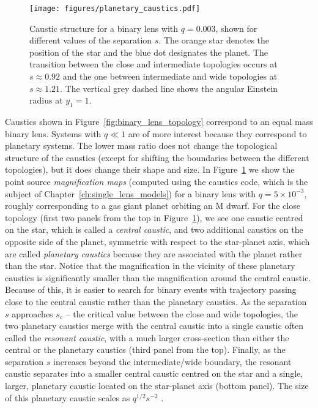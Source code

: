 \documentclass[12pt,dvipsnames]{report}
\newcommand{\ssf}[1]{\textsf{#1}}
\begin{document}
\begin{figure}[!t]
    \centering
    \texttt{[image: figures/planetary\_caustics.pdf]}
    \caption{Caustic structure for a binary lens with $q=0.003$, shown for different
        values of the separation $s$. The orange star denotes the position of the star and
        the blue dot designates the planet.
        The transition between the close and intermediate
        topologies occurs at $s\approx 0.92$ and the one between intermediate and wide
        topologies at $s\approx 1.21$. The vertical grey dashed line shows the angular
        Einstein radius at $y_1=1$. }
    \label{fig:planetary_caustics}
\end{figure}

Caustics shown in Figure~\ref{fig:binary_lens_topology} correspond to an equal
mass binary lens. Systems with $q\ll 1$ are of more interest because they correspond to
planetary systems. The lower mass ratio does not change the
topological structure of the caustics (except for shifting the boundaries
between the different topologies), but it does change their shape and size. In
Figure~\ref{fig:planetary_caustics} we show the point source \emph{magnification
    maps} (computed using the \ssf{caustics} code, which is the subject of
Chapter~\ref{ch:single_lens_models}) for a binary lens with $q=5\times
    10^{-3}$, roughly corresponding to a gas giant planet orbiting an M dwarf. For
the close topology (first two panels from the top in
Figure~\ref{fig:planetary_caustics}), we see one caustic centred on the star,
which is called a \emph{central caustic}, and two additional caustics on the
opposite side of the planet, symmetric with respect to the star-planet axis,
which are called \emph{planetary caustics} because they are associated with the
planet rather than the star. Notice that the magnification in the vicinity of
these planetary caustics is significantly smaller than the magnification around
the central caustic. Because of this, it is easier to search for binary events
with trajectory passing close to the central caustic rather than the planetary
caustics. As the separation $s$ approaches $s_c$ -- the critical value between
the close and wide topologies, the two planetary caustics merge with the
central caustic into a single caustic often called the \emph{resonant
    caustic}, with a much larger cross-section than either the central or the
planetary caustics (third panel from the top). Finally, as the separation $s$
increases beyond the intermediate/wide boundary, the resonant caustic
separates into a smaller central caustic centred on the star and a single,
larger, planetary caustic located on the star-planet axis (bottom panel). The
size of this planetary caustic scales as $q^{1/2}s^{-2}$ \citep[see references
    in review by][]{Gaudi2012}.
\end{document}
